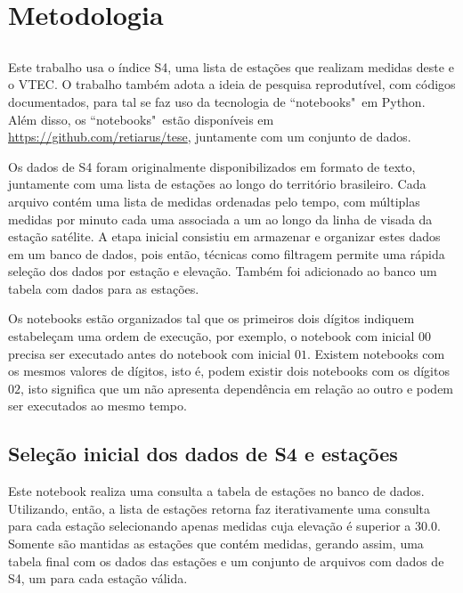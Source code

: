 \chapter{Metodologia}

\section{}

Este trabalho usa o índice S4, uma lista de estações que realizam medidas deste e o VTEC. O trabalho também adota a ideia de pesquisa reprodutível, com códigos documentados, para tal se faz uso da tecnologia de ``notebooks"~em Python. Além disso, os ``notebooks"~estão disponíveis em \url{https://github.com/retiarus/tese}, juntamente com um conjunto de dados. 

Os dados de S4 foram originalmente disponibilizados em formato de texto, juntamente com uma lista de estações ao longo do território brasileiro. Cada arquivo contém uma lista de medidas ordenadas pelo tempo, com múltiplas medidas por minuto cada uma associada a um ao longo da linha de visada da estação satélite. A etapa inicial consistiu em armazenar e organizar estes dados em um banco de dados, pois então, técnicas como filtragem permite uma rápida seleção dos dados por estação e elevação. Também foi adicionado ao banco um tabela com dados para as estações.

Os notebooks estão organizados tal que os primeiros dois dígitos indiquem estabeleçam uma ordem de execução, por exemplo, o notebook com inicial $00$ precisa ser executado antes do notebook com inicial $01$. Existem notebooks com os mesmos valores de dígitos, isto é, podem existir dois notebooks com os dígitos $02$, isto significa que um não apresenta dependência em relação ao outro e podem ser executados ao mesmo tempo.

\section{Seleção inicial dos dados de S4 e estações}

Este notebook realiza uma consulta a tabela de estações no banco de dados. Utilizando, então, a lista de estações retorna faz iterativamente uma consulta para cada estação selecionando apenas medidas cuja elevação é superior a 30.0. Somente são mantidas as estações que contém medidas, gerando assim, uma tabela final com os dados das estações e um conjunto de arquivos com dados de S4, um para cada estação válida.

